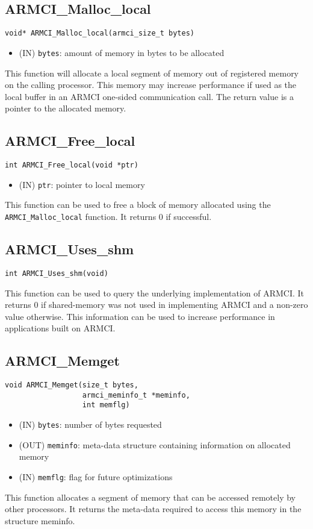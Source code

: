 \documentclass[12pt]{article}
\begin{document}
\subsection{ARMCI\_Malloc\_local}
\begin{verbatim}
void* ARMCI_Malloc_local(armci_size_t bytes)
\end{verbatim}
\begin{itemize}
\item (IN) \texttt{bytes}: amount of memory in bytes to be allocated
\end{itemize}
This function will allocate a local segment of memory out of registered memory on
the calling processor. This memory may increase performance if used as the local
buffer in an ARMCI one-sided communication call. The return value is a pointer
to the allocated memory.

\subsection{ARMCI\_Free\_local}
\begin{verbatim}
int ARMCI_Free_local(void *ptr)
\end{verbatim}
\begin{itemize}
\item (IN) \texttt{ptr}: pointer to local memory
\end{itemize}
This function can be used to free a block of memory allocated using the
\texttt{ARMCI\_Malloc\_local} function. It returns 0 if successful.

\subsection{ARMCI\_Uses\_shm}
\begin{verbatim}
int ARMCI_Uses_shm(void)
\end{verbatim}
This function can be used to query the underlying implementation of ARMCI. It
returns 0 if shared-memory was not used in implementing ARMCI and a non-zero
value otherwise. This information can be used to increase performance in
applications built on ARMCI.

\subsection{ARMCI\_Memget}
\begin{verbatim}
void ARMCI_Memget(size_t bytes,
                  armci_meminfo_t *meminfo,
                  int memflg)
\end{verbatim}
\begin{itemize}
\item (IN) \texttt{bytes}: number of bytes requested
\item (OUT) \texttt{meminfo}: meta-data structure containing information on
allocated memory
\item (IN) \texttt{memflg}: flag for future optimizations
\end{itemize}
This function allocates a segment of memory that can be accessed remotely by
other processors. It returns the meta-data required to access this memory in the
structure meminfo.
\end{document}
